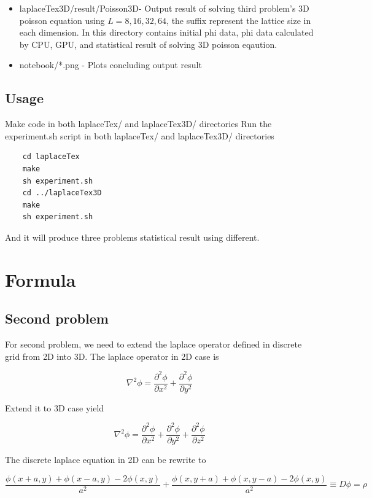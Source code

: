 \documentclass{article}
\begin{document}
\begin{itemize}
		\item laplaceTex3D/result/Poisson\textunderscore3D\textunderscore* - Output result of solving third problem's 3D poisson equation using $L=8, 16, 32, 64$, the suffix represent the lattice size in each dimension. In this directory contains initial phi data, phi data calculated by CPU, GPU, and statistical result of solving 3D poisson eqaution.
		\item notebook/*.png - Plots concluding output result
	\end{itemize}
	
	
	\subsection{Usage}
	Make code in both laplaceTex/ and laplaceTex3D/ directories
	Run the experiment.sh script in both laplaceTex/ and laplaceTex3D/ directories 
	
	\begin{verbatim}
	cd laplaceTex
	make
	sh experiment.sh
	cd ../laplaceTex3D
	make
	sh experiment.sh
	\end{verbatim}
	
	And it will produce three problems statistical result using different.
	\section{Formula}
	\subsection{Second problem}
	For second problem, we need to extend the laplace operator defined in discrete grid from 2D into 3D. The laplace operator in 2D case is
	
	\begin{equation}
	\nabla^2\phi=\frac{\partial^2\phi}{\partial{x}^2} + \frac{\partial^2\phi}{\partial{y}^2}
	\end{equation}
	
	Extend it to 3D case yield

	\begin{equation}
	\nabla^2\phi=\frac{\partial^2\phi}{\partial{x}^2} + \frac{\partial^2\phi}{\partial{y}^2} + \frac{\partial^2\phi}{\partial{z}^2}
	\end{equation}

	The discrete laplace equation in 2D can be rewrite to

	\begin{equation}
	\frac{\phi(x+a, y)+\phi(x-a, y)-2\phi(x, y)}{a^2}+\frac{\phi(x, y+a)+\phi(x, y-a)-2\phi(x, y)}{a^2}\equiv{D\phi}=\rho
	\end{equation}
	
\end{document}
